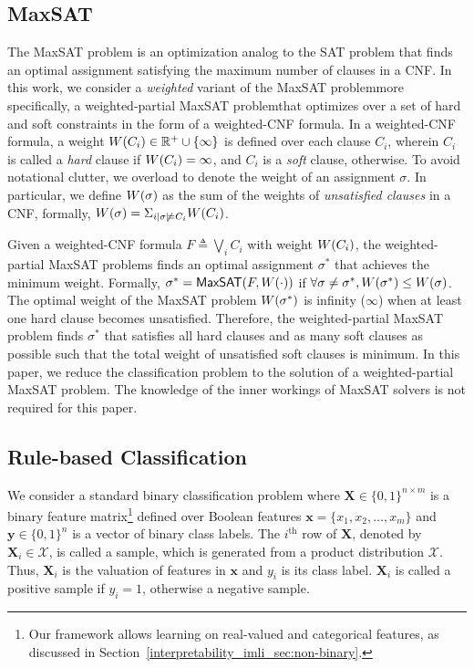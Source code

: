 \subsection{MaxSAT}

The MaxSAT problem is an optimization analog to the SAT problem that finds an optimal assignment satisfying the maximum number of clauses in a CNF. In this work, we consider a \emph{weighted} variant of the MaxSAT problem\textemdash more specifically, a weighted-partial MaxSAT problem\textemdash that optimizes over a set of hard and soft constraints in the form of a weighted-CNF formula. In a weighted-CNF formula, a weight $ {W \! \left( C_i \right)} \in \mathbb{R}^+ \cup \{\infty\} $ is defined over each clause $ C_i $, wherein $C_i$ is called a \emph{hard} clause if $W \! \left( C_i \right) = \infty$, and  $C_i$ is  a \emph{soft} clause, otherwise.  To avoid notational clutter, we overload {\weight{\cdot}} to denote the weight of an assignment $ \sigma $. In particular, we define $W \! \left( \sigma \right)$ as the sum of the weights of \emph{unsatisfied clauses} in a CNF, formally, $W \! \left( \sigma \right) = \Sigma_{i | \sigma \not \models C_i} W \! \left( C_i \right)$.


Given a weighted-CNF formula $F \triangleq \bigvee_i C_i$ with weight $ W \! \left( C_i \right) $, the weighted-partial MaxSAT problems finds an optimal assignment $\sigma^*$ that achieves the minimum weight. Formally,  $\sigma^* = \mathsf{MaxSAT}(F,W \! \left( \cdot \right))$ if $\forall \sigma \neq \sigma^*, W \! \left( \sigma^* \right) \leq W \! \left( \sigma \right)$. The optimal weight of the MaxSAT problem $  W \! \left( \sigma^* \right) $ is infinity ($ \infty $) when at least one hard clause becomes unsatisfied.  Therefore,  the weighted-partial MaxSAT problem finds $ \sigma^* $ that satisfies all hard clauses and as many soft clauses as possible such that the total weight of unsatisfied soft clauses is minimum. In this paper, we reduce the classification problem  to the solution of a weighted-partial MaxSAT problem. The knowledge of the inner workings of {MaxSAT} solvers is  not required for this paper.   


\subsection{Rule-based Classification}

We consider a standard binary classification problem where $ \mathbf{X} \in \{0,1\}^{n\times m} $ is a binary feature matrix\footnote{Our framework allows learning on real-valued and categorical features, as discussed in Section~\ref{interpretability_imli_sec:non-binary}.} defined over Boolean features $\mathbf{x} = \{x_1, x_2, \dots, x_m\}$ and $ \mathbf{y} \in \{0,1\}^n $ is a vector of binary class labels.  The $ i^\text{th} $ row of $ \mathbf{X} $, denoted by $ \mathbf{X}_i \in \mathcal{X} $, is called a sample, which is generated from a product distribution $ \mathcal{X} $. Thus, $ \mathbf{X}_i $ is the valuation of features in $ \mathbf{x} $ and $ y_i $ is its class label.  $ \mathbf{X}_i $ is called a positive sample if $ y_i = 1 $, otherwise a negative sample.


